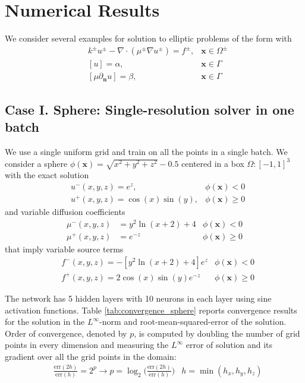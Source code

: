 \documentclass{elsarticle}
\begin{document}
\section{Numerical Results} \label{sec:examples}

We consider several examples for solution to elliptic problems of the form with
\begin{align*}
	 & k^{\pm}u^{\pm} - \nabla \cdot (\mu^{\pm}\nabla u^\pm)=f^{\pm}, & \mathbf{x}\in\Omega^\pm \\
	 & [u]=\alpha,                                                    & \mathbf{x} \in \Gamma   \\
	 & [\mu \partial_{\mathbf{n}}u]=\beta,                            & \mathbf{x} \in \Gamma
\end{align*}



\subsection{Case I. Sphere: Single-resolution solver in one batch}
We use a single uniform grid and train on all the points in a single batch. We consider a sphere $\phi(\mathbf{x})=\sqrt{x^2 + y^2 + z^2} - 0.5$ centered in a box $\Omega:[-1,1]^3$ with the exact solution
\begin{align*}
& u^-(x,y,z)=e^{z}, & \phi(\mathbf{x})<0\\
& u^+(x,y,z)=\cos(x)\sin(y), & \phi(\mathbf{x})\ge 0
\end{align*}
and variable diffusion coefficients
\begin{align*}
\mu^-(x,y,z)&=y^2 \ln(x+2) + 4 &\phi(\mathbf{x})<0 \\
\mu^+(x,y,z)&=e^{-z} &\phi(\mathbf{x})\ge 0 
\end{align*}
that imply variable source terms
\begin{align*}
&f^-(x,y,z)=-[y^2\ln(x+2) + 4] e^{z} &\phi(\mathbf{x})< 0\\
&f^+(x,y,z)=2\cos(x)\sin(y)e^{-z} &\phi(\mathbf{x})\ge 0
\end{align*}

The network has 5 hidden layers with 10 neurons in each layer using sine activation functions. Table \ref{tab:convergence_sphere} reports convergence results for the solution in the $L^\infty$-norm and root-mean-squared-error of the solution. Order of convergence, denoted by $p$, is computed by doubling the number of grid points in every dimension and measuring the $L^\infty$ error of solution and its gradient over all the grid points in the domain:
\begin{align*}
&\frac{\textrm{err}(2h)}{\textrm{err}(h)}=2^p \rightarrow p = \log_2\bigg(\frac{\textrm{err}(2h)}{\textrm{err}(h)}\bigg)  & h=\min(h_x,h_y,h_z)
\end{align*}
\end{document}
